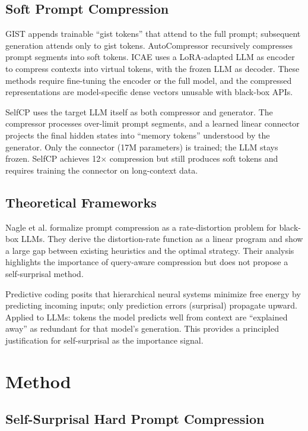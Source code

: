 \documentclass[11pt,letterpaper]{article}
\begin{document}
\subsection{Soft Prompt Compression}

GIST \citep{Mu2023} appends trainable ``gist tokens'' that attend to the full prompt; subsequent generation attends only to gist tokens. AutoCompressor \citep{Chevalier2023} recursively compresses prompt segments into soft tokens. ICAE \citep{Ge2023} uses a LoRA-adapted LLM as encoder to compress contexts into virtual tokens, with the frozen LLM as decoder. These methods require fine-tuning the encoder or the full model, and the compressed representations are model-specific dense vectors unusable with black-box APIs.

SelfCP \citep{Gao2024} uses the target LLM itself as both compressor and generator. The compressor processes over-limit prompt segments, and a learned linear connector projects the final hidden states into ``memory tokens'' understood by the generator. Only the connector (17M parameters) is trained; the LLM stays frozen. SelfCP achieves 12$\times$ compression but still produces soft tokens and requires training the connector on long-context data.

\subsection{Theoretical Frameworks}

Nagle et al. \citep{Nagle2024} formalize prompt compression as a rate-distortion problem for black-box LLMs. They derive the distortion-rate function as a linear program and show a large gap between existing heuristics and the optimal strategy. Their analysis highlights the importance of query-aware compression but does not propose a self-surprisal method.

Predictive coding \citep{Friston2009} posits that hierarchical neural systems minimize free energy by predicting incoming inputs; only prediction errors (surprisal) propagate upward. Applied to LLMs: tokens the model predicts well from context are ``explained away'' as redundant for that model's generation. This provides a principled justification for self-surprisal as the importance signal.

\section{Method}

\subsection{Self-Surprisal Hard Prompt Compression}
\end{document}
